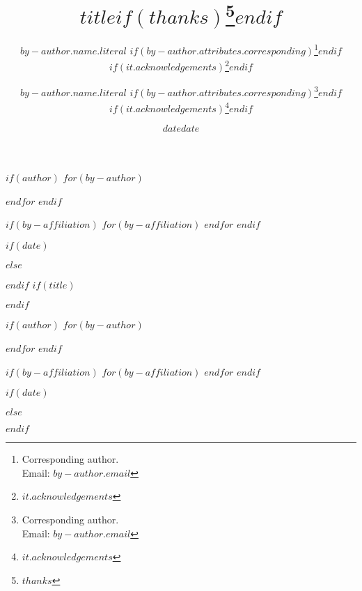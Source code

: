 $if(author)$
$for(by-author)$
\author[$for(by-author.affiliations)$$it.number$$sep$, $endfor$]{$by-author.name.literal$%
$if(by-author.attributes.corresponding)$\thanks{Corresponding author.\\ Email: \texttt{$by-author.email$}}$endif$%
  $if(it.acknowledgements)$\thanks{$it.acknowledgements$}$endif$ }
$endfor$
$endif$

$if(by-affiliation)$
$for(by-affiliation)$
$endfor$
$endif$

$if(date)$
\date{$date$}
$else$
\date{} %
$endif$
$if(title)$
\title{$title$$if(thanks)$\thanks{$thanks$}$endif$}
$endif$

$if(author)$
$for(by-author)$
\author[$for(by-author.affiliations)$$it.number$$sep$, $endfor$]{$by-author.name.literal$%
$if(by-author.attributes.corresponding)$\thanks{Corresponding author.\\ Email: \texttt{$by-author.email$}}$endif$%
  $if(it.acknowledgements)$\thanks{$it.acknowledgements$}$endif$ }
$endfor$
$endif$

$if(by-affiliation)$
$for(by-affiliation)$
$endfor$
$endif$

$if(date)$
\date{$date$}
$else$
\date{} %
$endif$